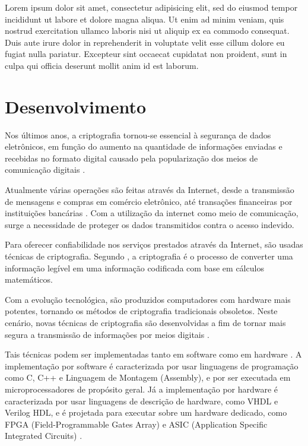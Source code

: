 \documentclass{tcc}
\begin{document}
	Lorem ipsum dolor sit amet, consectetur adipisicing elit, sed do eiusmod
	tempor incididunt ut labore et dolore magna aliqua. Ut enim ad minim veniam,
	quis nostrud exercitation ullamco laboris nisi ut aliquip ex ea commodo
	consequat. Duis aute irure dolor in reprehenderit in voluptate velit esse
	cillum dolore eu fugiat nulla pariatur. Excepteur sint occaecat cupidatat non
	proident, sunt in culpa qui officia deserunt mollit anim id est laborum.

	\chapter[Desenvolvimento]{Desenvolvimento}

Nos últimos anos, a criptografia tornou-se essencial à segurança de dados eletrônicos, em função do aumento na quantidade de informações enviadas e recebidas no formato digital causado pela popularização dos meios de comunicação digitais \cite{deshpande2009fpga, almeidaconstruccao}.

Atualmente várias operações são feitas através da Internet, desde a transmissão de mensagens e compras em comércio eletrônico, até transações financeiras por instituições bancárias \cite{grandesDesafios2013}. Com a utilização da internet como meio de comunicação, surge a necessidade de proteger os dados transmitidos contra o acesso indevido.

Para oferecer confiabilidade nos serviços prestados através da Internet, são usadas técnicas de criptografia. Segundo , a criptografia é o processo de converter uma informação legível em uma informação codificada com base em cálculos matemáticos.

Com a evolução tecnológica, são produzidos computadores com hardware mais potentes, tornando os métodos de criptografia tradicionais obsoletos. Neste cenário, novas técnicas de criptografia são desenvolvidas a fim de tornar mais segura a transmissão de informações por meios digitais \cite{modeloAESsimplificado}. 

Tais técnicas podem ser implementadas tanto em software como em hardware \cite{almeidaconstruccao}. A implementação por software é caracterizada por usar linguagens de programação como C, C++ e Linguagem de Montagem (Assembly), e por ser executada em microprocessadores de propósito geral. Já a implementação por hardware é caracterizada por usar linguagens de descrição de hardware, como VHDL e Verilog HDL, e é projetada para executar sobre um hardware dedicado, como FPGA (Field-Programmable Gates Array) e  ASIC (Application Specific Integrated Circuits) \cite{gaj2009fpga}.
\end{document}
